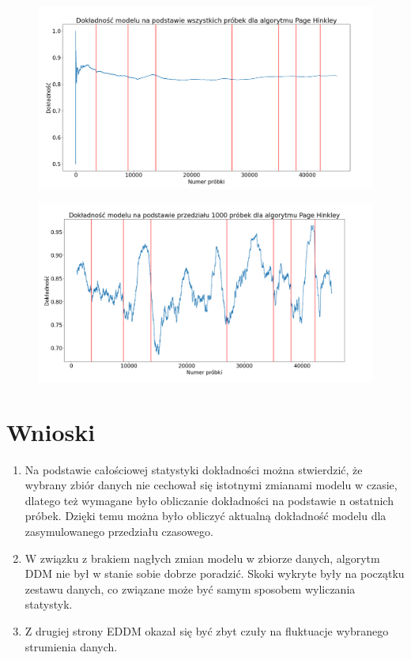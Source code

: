 \documentclass{classrep}
\begin{document}
\begin{figure}[H]
    \centering
    \includegraphics[width=1\textwidth]{resources/stage1/Page.png}
    \label{DDM}
\end{figure}

\begin{figure}[H]
    \centering
    \includegraphics[width=1\textwidth]{resources/stage1/Page_win.png}
    \label{DDMw}
\end{figure}

\section{Wnioski}

\begin{enumerate}
    \item Na podstawie całościowej statystyki dokładności można stwierdzić, że wybrany zbiór danych nie cechował się istotnymi zmianami modelu w czasie, dlatego też wymagane było obliczanie dokładności na podstawie n ostatnich próbek. Dzięki temu można było obliczyć aktualną dokładność modelu dla zasymulowanego przedziału czasowego.
    \item W związku z brakiem nagłych zmian modelu w zbiorze danych, algorytm DDM nie był w stanie sobie dobrze poradzić. Skoki wykryte były na początku zestawu danych, co związane może być samym sposobem wyliczania statystyk. 
    \item Z drugiej strony EDDM okazał się być zbyt czuły na fluktuacje wybranego strumienia danych.
\end{enumerate}
\end{document}
